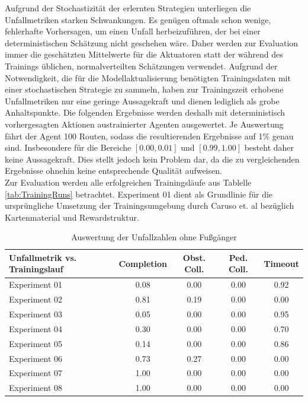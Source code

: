 Aufgrund der Stochastizität der erlernten Strategien unterliegen die Unfallmetriken
starken Schwankungen. Es genügen oftmals schon wenige, fehlerhafte Vorhersagen,
um einen Unfall herbeizuführen, der bei einer deterministischen Schätzung nicht
geschehen wäre. Daher werden zur Evaluation immer die geschätzten Mittelwerte für die
Aktuatoren statt der während des Trainings üblichen, normalverteilten Schätzungen
verwendet. Aufgrund der Notwendigkeit, die für die Modellaktualisierung benötigten
Trainingsdaten mit einer stochastischen Strategie zu sammeln, haben zur Trainingszeit
erhobene Unfallmetriken nur eine geringe Aussagekraft und dienen lediglich als grobe
Anhaltspunkte. Die folgenden Ergebnisse werden deshalb mit deterministisch
vorhergesagten Aktionen austrainierter Agenten ausgewertet. Je Auswertung fährt der
Agent 100 Routen, sodass die resultierenden Ergebnisse auf 1\% genau sind. Insbesondere
für die Bereiche $[0.00, 0.01]$ und $[0.99, 1.00]$ besteht daher keine Aussagekraft.
Dies stellt jedoch kein Problem dar, da die zu vergleichenden Ergebnisse ohnehin
keine entsprechende Qualität aufweisen.\\

Zur Evaluation werden alle erfolgreichen Trainingsläufe aus Tablelle \ref{tab:TrainingRuns}
betrachtet. Experiment 01 dient als Grundlinie für die ursprüngliche Umsetzung der
Trainingsumgebung durch Caruso et. al \cite{machines11020268} bezüglich Kartenmaterial
und Rewardstruktur.

\begin{table}[h]
\centering
\begin{tabular}{ |p{3cm}||c|c|c|c| }
 \hline
 Unfallmetrik vs. Trainingslauf & Completion & Obst. Coll. & Ped. Coll. & Timeout \\
 \hline \hline
 Experiment 01 & 0.08 & 0.00 & 0.00 & 0.92 \\ \hline
 Experiment 02 & 0.81 & 0.19 & 0.00 & 0.00 \\ \hline
 Experiment 03 & 0.05 & 0.00 & 0.00 & 0.95 \\ \hline
 Experiment 04 & 0.30 & 0.00 & 0.00 & 0.70 \\ \hline
 Experiment 05 & 0.14 & 0.00 & 0.00 & 0.86 \\ \hline
 Experiment 06 & 0.73 & 0.27 & 0.00 & 0.00 \\ \hline
 Experiment 07 & 1.00 & 0.00 & 0.00 & 0.00 \\ \hline
 Experiment 08 & 1.00 & 0.00 & 0.00 & 0.00 \\
 \hline
 \end{tabular}
 \caption{Auswertung der Unfallzahlen ohne Fußgänger}
 \label{tab:EvalNoPeds}
\end{table}

